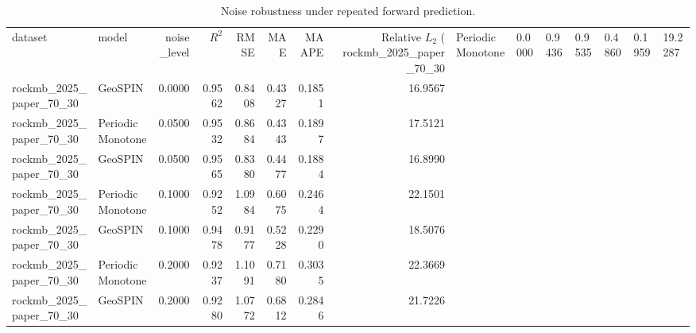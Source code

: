 \begin{table}
\caption{Noise robustness under repeated forward prediction.}
\label{tab:noise_robustness}
\begin{tabular}{llrrrrrr}
\toprule
dataset & model & noise_level & $R^2$ & RMSE & MAE & MAAPE & Relative $L_2$ (%
\midrule
rockmb_2025_paper_70_30 & PeriodicMonotone & 0.0000 & 0.9436 & 0.9535 & 0.4860 & 0.1959 & 19.2287 \\
rockmb_2025_paper_70_30 & GeoSPIN & 0.0000 & 0.9562 & 0.8408 & 0.4327 & 0.1851 & 16.9567 \\
rockmb_2025_paper_70_30 & PeriodicMonotone & 0.0500 & 0.9532 & 0.8684 & 0.4343 & 0.1897 & 17.5121 \\
rockmb_2025_paper_70_30 & GeoSPIN & 0.0500 & 0.9565 & 0.8380 & 0.4477 & 0.1884 & 16.8990 \\
rockmb_2025_paper_70_30 & PeriodicMonotone & 0.1000 & 0.9252 & 1.0984 & 0.6075 & 0.2464 & 22.1501 \\
rockmb_2025_paper_70_30 & GeoSPIN & 0.1000 & 0.9478 & 0.9177 & 0.5228 & 0.2290 & 18.5076 \\
rockmb_2025_paper_70_30 & PeriodicMonotone & 0.2000 & 0.9237 & 1.1091 & 0.7180 & 0.3035 & 22.3669 \\
rockmb_2025_paper_70_30 & GeoSPIN & 0.2000 & 0.9280 & 1.0772 & 0.6812 & 0.2846 & 21.7226 \\
\bottomrule
\end{tabular}
\end{table}
